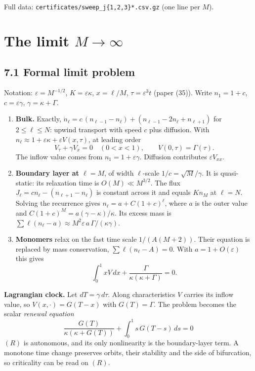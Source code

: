 \documentclass[11pt,a4paper]{report}
\begin{document}
Full data: \texttt{certificates/sweep\_j\{1,2,3\}*.csv.gz} (one line per \(M\)).

\section{\texorpdfstring{The limit \(M\to\infty\)}{The limit M\textbackslash to\textbackslash infty}}

\subsection{7.1 Formal limit problem}

Notation: \(\varepsilon=M^{-1/2}\), \(K=\varepsilon\kappa\), \(x=\ell/M\), \(\tau=\varepsilon^3t\) (paper (35)).
Write \(n_1=1+c\), \(c=\varepsilon\gamma\), \(\gamma=\kappa+\Gamma\).

\begin{enumerate}
\def\labelenumi{\arabic{enumi}.}
\tightlist
\item
  \textbf{Bulk.} Exactly, \(\dot n_\ell=c\,(n_{\ell-1}-n_\ell)+(n_{\ell-1}-2n_\ell+n_{\ell+1})\) for \(2\le\ell\le N\):
  upwind transport with speed \(c\) plus diffusion. With \(n_\ell\approx 1+\varepsilon\kappa+\varepsilon V(x,\tau)\),
  at leading order
  \[V_\tau+\gamma V_x=0 \quad (0<x<1),\qquad V(0,\tau)=\Gamma(\tau).\]
  The inflow value comes from \(n_1=1+\varepsilon\gamma\). Diffusion contributes \(\varepsilon V_{xx}\).
\item
  \textbf{Boundary layer at \(\ell=M\)}, of width \(\ell\)-scale \(1/c=\sqrt M/\gamma\). It is quasi-static: its
  relaxation time is \(O(M)\ll M^{3/2}\). The flux \(J_\ell=cn_\ell-(n_{\ell+1}-n_\ell)\) is constant across it and
  equals \(Kn_M\) at \(\ell=N\). Solving the recurrence gives \(n_\ell=a+C(1+c)^\ell\), where \(a\) is the outer
  value and \(C(1+c)^M=a(\gamma-\kappa)/\kappa\). Its excess mass is
  \(\sum\ell(n_\ell-a)\approx M^2\varepsilon\,a\,\Gamma/(\kappa\gamma)\).
\item
  \textbf{Monomers} relax on the fast time scale \(1/(A(M+2))\). Their equation is replaced by mass conservation,
  \(\sum\ell(n_\ell-A)=0\). With \(a=1+O(\varepsilon)\) this gives
  \[\int_0^1xV\,dx+\frac{\Gamma}{\kappa(\kappa+\Gamma)}=0 .\]
\end{enumerate}

\textbf{Lagrangian clock.} Let \(dT=\gamma\,d\tau\). Along characteristics \(V\) carries its inflow value, so
\(V(x,\cdot)=G(T-x)\) with \(G(T)=\Gamma\). The problem becomes the scalar \emph{renewal equation}
\[\boxed{\ \frac{G(T)}{\kappa(\kappa+G(T))}+\int_0^1 s\,G(T-s)\,ds=0\ }\tag{R}\]
\((R)\) is autonomous, and its only nonlinearity is the boundary-layer term. A monotone time change preserves
orbits, their stability and the side of bifurcation, so criticality can be read on \((R)\).
\end{document}
